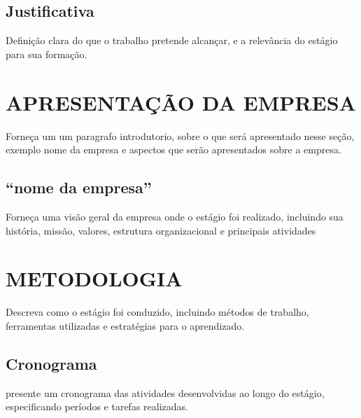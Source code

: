 \subsection{Justificativa} \label{sec:justificativa}

Definição clara do que o trabalho pretende alcançar, e a relevância do estágio para sua formação.

\section{APRESENTAÇÃO DA EMPRESA} \label{ch:apresentacao-empresa}
Forneça um um paragrafo introdutorio, sobre o que será apresentado nesse seção, exemplo nome da empresa e aspectos que serão apresentados sobre a empresa.

\subsection{``nome da empresa''} \label{sec:nome-da-empresa}
Forneça uma visão geral da empresa onde o estágio foi realizado, incluindo sua história, missão, valores, estrutura organizacional e principais atividades


\section{METODOLOGIA} \label{ch:metodologia}

Descreva como o estágio foi conduzido, incluindo métodos de trabalho, ferramentas utilizadas e estratégias para o aprendizado.

\subsection{Cronograma} \label{sec:cronograma}

presente um cronograma das atividades desenvolvidas ao longo do estágio, especificando períodos e tarefas realizadas.


